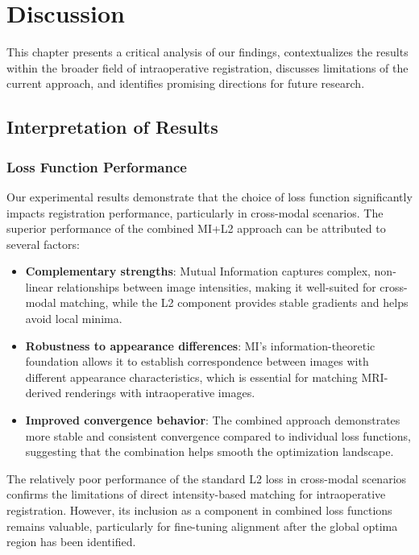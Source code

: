 
\chapter{Discussion}\label{chapter:discussion}

This chapter presents a critical analysis of our findings, contextualizes the results within the broader field of intraoperative registration, discusses limitations of the current approach, and identifies promising directions for future research.

\section{Interpretation of Results}

\subsection{Loss Function Performance}

Our experimental results demonstrate that the choice of loss function significantly impacts registration performance, particularly in cross-modal scenarios. The superior performance of the combined MI+L2 approach can be attributed to several factors:

\begin{itemize}
    \item \textbf{Complementary strengths}: Mutual Information captures complex, non-linear relationships between image intensities, making it well-suited for cross-modal matching, while the L2 component provides stable gradients and helps avoid local minima.
    
    \item \textbf{Robustness to appearance differences}: MI's information-theoretic foundation allows it to establish correspondence between images with different appearance characteristics, which is essential for matching MRI-derived renderings with intraoperative images.
    
    \item \textbf{Improved convergence behavior}: The combined approach demonstrates more stable and consistent convergence compared to individual loss functions, suggesting that the combination helps smooth the optimization landscape.
\end{itemize}

The relatively poor performance of the standard L2 loss in cross-modal scenarios confirms the limitations of direct intensity-based matching for intraoperative registration. However, its inclusion as a component in combined loss functions remains valuable, particularly for fine-tuning alignment after the global optima region has been identified.

